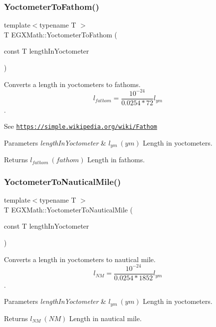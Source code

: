 \subsubsection{\texorpdfstring{Yoctometer\+To\+Fathom()}{YoctometerToFathom()}}
{\footnotesize\ttfamily template$<$typename T $>$ \\
T E\+G\+X\+Math\+::\+Yoctometer\+To\+Fathom (\begin{DoxyParamCaption}\item[{const T}]{length\+In\+Yoctometer }\end{DoxyParamCaption})}



Converts a length in yoctometers to fathoms. \[ l_{fathom}= \frac{10^{-24}}{0.0254 * 72} l_{ym} \]. 

See \href{https://simple.wikipedia.org/wiki/Fathom}{\tt https\+://simple.\+wikipedia.\+org/wiki/\+Fathom} 
\begin{DoxyParams}{Parameters}
{\em length\+In\+Yoctometer} & $ l_{ym}\ (ym)$ Length in yoctometers. \\
\hline
\end{DoxyParams}
\begin{DoxyReturn}{Returns}
$ l_{fathom}\ (fathom)$ Length in fathoms. 
\end{DoxyReturn}
\mbox{\label{group___e_g_x_math-_conversions-_length_conversions-_s_i-_yoctometer-_nautical_gae49dab08f77667adbef6d419339a54c0}} 
\subsubsection{\texorpdfstring{Yoctometer\+To\+Nautical\+Mile()}{YoctometerToNauticalMile()}}
{\footnotesize\ttfamily template$<$typename T $>$ \\
T E\+G\+X\+Math\+::\+Yoctometer\+To\+Nautical\+Mile (\begin{DoxyParamCaption}\item[{const T}]{length\+In\+Yoctometer }\end{DoxyParamCaption})}



Converts a length in yoctometers to nautical mile. \[ l_{NM}= \frac{10^{-24}}{0.0254 * 1852} l_{ym} \]. 


\begin{DoxyParams}{Parameters}
{\em length\+In\+Yoctometer} & $ l_{ym}\ (ym)$ Length in yoctometers. \\
\hline
\end{DoxyParams}
\begin{DoxyReturn}{Returns}
$ l_{NM}\ (NM)$ Length in nautical mile. 
\end{DoxyReturn}
